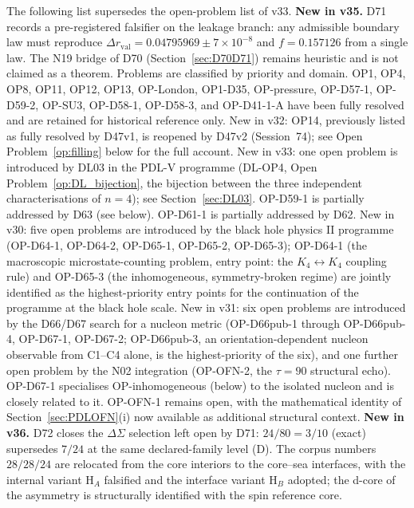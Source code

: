 \documentclass[11pt,a4paper]{article}
\theoremstyle{plain}
\theoremstyle{definition}
\theoremstyle{remark}
\begin{document}
The following list supersedes the open-problem list of v33. \textcolor{negativered}{\textbf{New in v35.}} D71 records a pre-registered falsifier on the leakage branch: any admissible boundary law must reproduce $\Delta r_{\mathrm{val}}=0.04795969\pm7\times10^{-8}$ and $f=0.157126$ from a single law. The N19 bridge of D70 (Section~\ref{sec:D70D71}) remains heuristic and is not claimed as a theorem. Problems are classified by priority and domain. OP1, OP4, OP8, OP11, OP12, OP13, OP-London, OP1-D35, OP-pressure, OP-D57-1, OP-D59-2, OP-SU3, OP-D58-1, OP-D58-3, and OP-D41-1-A have been fully resolved and are retained for historical reference only. \textcolor{negativered}{New in v32: OP14, previously listed as fully resolved by D47v1, is reopened by D47v2 (Session~74); see Open Problem~\ref{op:filling} below for the full account.} New in v33: one open problem is introduced by DL03 in the PDL-V programme (DL-OP4, Open Problem~\ref{op:DL_bijection}, the bijection between the three independent characterisations of $n=4$); see Section~\ref{sec:DL03}. OP-D59-1 is partially addressed by D63 (see below). OP-D61-1 is partially addressed by D62. New in v30: five open problems are introduced by the black hole physics II programme (OP-D64-1, OP-D64-2, OP-D65-1, OP-D65-2, OP-D65-3); OP-D64-1 (the macroscopic microstate-counting problem, entry point: the $K_4\leftrightarrow K_4$ coupling rule) and OP-D65-3 (the inhomogeneous, symmetry-broken regime) are jointly identified as the highest-priority entry points for the continuation of the programme at the black hole scale. New in v31: six open problems are introduced by the D66/D67 search for a nucleon metric (OP-D66pub-1 through OP-D66pub-4, OP-D67-1, OP-D67-2; OP-D66pub-3, an orientation-dependent nucleon observable from C1--C4 alone, is the highest-priority of the six), and one further open problem by the N02 integration (OP-OFN-2, the $\tau=90$ structural echo). OP-D67-1 specialises OP-inhomogeneous (below) to the isolated nucleon and is closely related to it. OP-OFN-1 remains open, with the mathematical identity of Section~\ref{sec:PDLOFN}(i) now available as additional structural context. \textcolor{negativered}{\textbf{New in v36.}} D72 closes the $\Delta\Sigma$ selection left open by D71: $24/80=3/10$ (exact) supersedes $7/24$ at the same declared-family level (D). The corpus numbers $28/28/24$ are relocated from the core interiors to the core--sea interfaces, with the internal variant H$_{A}$ falsified and the interface variant H$_{B}$ adopted; the d-core of the asymmetry is structurally identified with the spin reference core.
\end{document}
